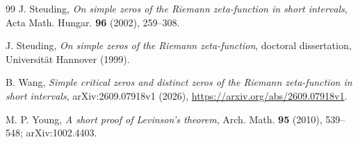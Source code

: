 \documentclass[11pt]{article}
\theoremstyle{remark}
\begin{document}
\begin{thebibliography}{99}
J. Steuding,
\emph{On simple zeros of the Riemann zeta-function in short intervals},
Acta Math. Hungar. \textbf{96} (2002), 259--308.

J. Steuding,
\emph{On simple zeros of the Riemann zeta-function},
doctoral dissertation, Universit\"at Hannover (1999).

B. Wang,
\emph{Simple critical zeros and distinct zeros of the Riemann zeta-function
in short intervals},
arXiv:2609.07918v1 (2026),
\url{https://arxiv.org/abs/2609.07918v1}.

M. P. Young,
\emph{A short proof of Levinson's theorem},
Arch. Math. \textbf{95} (2010), 539--548; arXiv:1002.4403.

\end{thebibliography}
\end{document}
